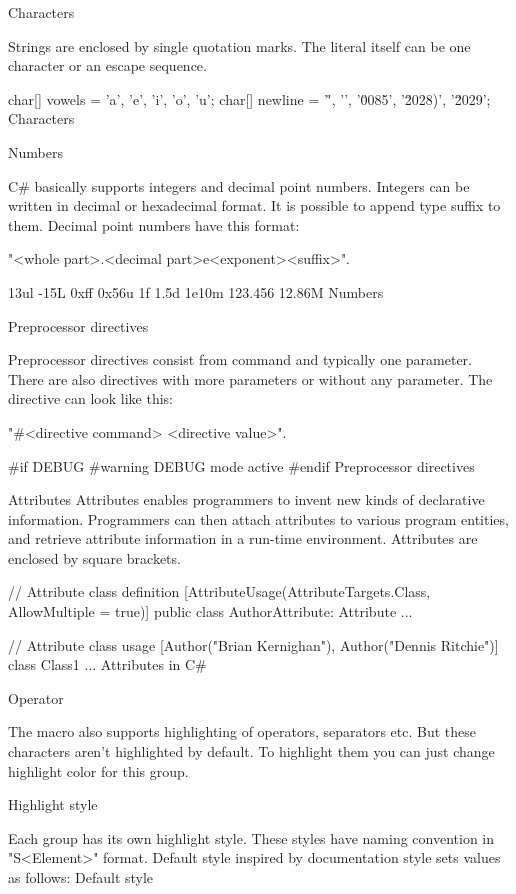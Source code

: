 \secc Characters

Strings are enclosed by single quotation marks.
The literal itself can be one character or an escape sequence.

\begtt
char[] vowels = {'a', 'e', 'i', 'o', 'u'};
char[] newline = {'\r', '\n', '\u0085', '\u2028)', '\u2029'};
\endtt
\priklad Characters

\secc Numbers

C\# basically supports integers and decimal point numbers.
Integers can be written in decimal or hexadecimal format.
It is possible to append type suffix to them.
Decimal point numbers have this format:

"<whole part>.<decimal part>e<exponent><suffix>".

         13ul         -15L       0xff         0x56u
    1f         1.5d        1e10m    123.456        12.86M
\endtt
\priklad Numbers

\sec Preprocessor directives

Preprocessor directives consist from command and typically one parameter.
There are also directives with more parameters or without any parameter.
The directive can look like this:

"#<directive command> <directive value>".

\begtt
#if DEBUG
#warning DEBUG mode active
#endif
\endtt
\priklad Preprocessor directives

\sec Attributes
Attributes enables programmers to invent new kinds of declarative information.
Programmers can then attach attributes to various program entities, and retrieve attribute information in a run-time environment.
Attributes are enclosed by square brackets.

\begtt
// Attribute class definition
[AttributeUsage(AttributeTargets.Class, AllowMultiple = true)]
public class AuthorAttribute: Attribute
{ ... }

// Attribute class usage
[Author("Brian Kernighan"), Author("Dennis Ritchie")]
class Class1
{ ... }
\endtt
\priklad Attributes in C\#

\sec Operator

The macro also supports highlighting of operators, separators etc.
But these characters aren't highlighted by default.
To highlight them you can just change highlight color for this group.

\chap Highlight style

Each group has its own highlight style.
These styles have naming convention in "S<Element>" format.
Default style inspired by documentation style sets values as follows:
\midinsert
{}
\begtt
\let\SComment=\Green      %
\let\SDocComment=\Grey    %
\let\SPreprocKW=\Magenta  %
\let\SPreprocVal=\Magenta %
\let\SKeyword=\Blue       %
\let\SAttribute=\Cyan     %
\let\SLiteral=\Cyan       %
\let\SString=\Red         %
\let\SChar=\Red           %
\let\SNumber=\Black       %
\let\SOper=\Black         %
\endtt
\priklad Default style
\endinsert

